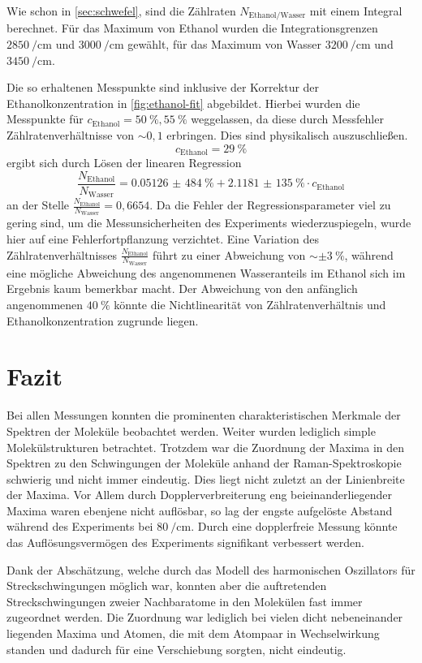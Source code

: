 \documentclass[../bericht.tex]{subfiles}
\begin{document}
    Wie schon in \cref{sec:schwefel}, sind die Zählraten $N_\mathrm{Ethanol/Wasser}$ mit einem Integral berechnet. Für das Maximum von Ethanol wurden die Integrationsgrenzen $\SI{2850}{\per\centi\meter}$ und $\SI{3000}{\per\centi\meter}$ gewählt, für das Maximum von Wasser $\SI{3200}{\per\centi\meter}$ und $\SI{3450}{\per\centi\meter}$.

    Die so erhaltenen Messpunkte sind inklusive der Korrektur der Ethanolkonzentration in \cref{fig:ethanol-fit} abgebildet. Hierbei wurden die Messpunkte für $c_\mathrm{Ethanol}=\SI{50}{\percent}, \SI{55}{\percent}$ weggelassen, da diese durch Messfehler Zählratenverhältnisse von $\sim{0,1}$ erbringen. Dies sind physikalisch auszuschließen.
    \begin{equation*}
      c_\mathrm{Ethanol}=\SI{29}{\percent}
    \end{equation*}
    ergibt sich durch Lösen der linearen Regression
    \begin{equation*}
      \frac{N_\mathrm{Ethanol}}{N_\mathrm{Wasser}}=\SI{0,05126(484)}{\percent}+\SI{2,1181(135)}{\percent}\cdot c_\mathrm{Ethanol}
    \end{equation*}
    an der Stelle $\frac{N_\mathrm{Ethanol}}{N_\mathrm{Wasser}}=0,6654$. Da die Fehler der Regressionsparameter viel zu gering sind, um die Messunsicherheiten des Experiments wiederzuspiegeln, wurde hier auf eine Fehlerfortpflanzung verzichtet. Eine Variation des Zählratenverhältnisses $\frac{N_\mathrm{Ethanol}}{N_\mathrm{Wasser}}$ führt zu einer Abweichung von $\sim \pm\SI{3}{\percent}$, während eine mögliche Abweichung des angenommenen Wasseranteils im Ethanol sich im Ergebnis kaum bemerkbar macht.
    Der Abweichung von den anfänglich angenommenen $\SI{40}{\percent}$ könnte die Nichtlinearität von Zählratenverhältnis und Ethanolkonzentration zugrunde liegen.


  \section{Fazit}

    Bei allen Messungen konnten die prominenten charakteristischen Merkmale der Spektren der Moleküle beobachtet werden. Weiter wurden lediglich simple Molekülstrukturen betrachtet. Trotzdem war die Zuordnung der Maxima in den Spektren zu den Schwingungen der Moleküle anhand der Raman-Spektroskopie schwierig und nicht immer eindeutig. Dies liegt nicht zuletzt an der Linienbreite der Maxima. Vor Allem durch Dopplerverbreiterung eng beieinanderliegender Maxima waren ebenjene nicht auflösbar, so lag der engste aufgelöste Abstand während des Experiments bei $\SI{80}{\per\centi\meter}$. Durch eine dopplerfreie Messung könnte das Auflösungsvermögen des Experiments signifikant verbessert werden.

    Dank der Abschätzung, welche durch das Modell des harmonischen Oszillators für Streckschwingungen möglich war, konnten aber die auftretenden Streckschwingungen zweier Nachbaratome in den Molekülen fast immer zugeordnet werden. Die Zuordnung war lediglich bei vielen dicht nebeneinander liegenden Maxima und Atomen, die mit dem Atompaar in Wechselwirkung standen und dadurch für eine Verschiebung sorgten, nicht eindeutig.
\end{document}
